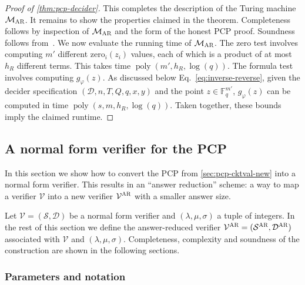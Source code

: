 \documentclass[11pt]{article}
\theoremstyle{definition}
\newcommand{\F}{\ensuremath{\mathbb{F}}}
\DeclareMathOperator{\poly}{poly}
\newcommand{\sampler}{\mathcal{S}}
\newcommand{\decider}{\mathcal{D}}
\newcommand{\verifier}{\mathcal{V}}
\newcommand{\gamestyle}[1]{\ensuremath{\textsc{#1}}\xspace}
\newcommand{\ar}{\gamestyle{AR}}
\newcommand{\pcpverifier}{\mathcal{M}_\ar}
\newcommand{\qlen}{Q}
\begin{document}
\begin{proof}[Proof of \cref{thm:pcp-decider}]
  This completes the description of the Turing machine $\pcpverifier$.
  It remains to show the properties claimed in the theorem.
  Completeness follows by inspection of $\pcpverifier$ and the form of the
  honest PCP proof.
  Soundness follows from~\cite[Proposition~11.8]{NW19}.
  We now evaluate the running time of $\pcpverifier$.
  The zero test involves computing $m'$ different $\mathrm{zero}_i(z_i)$ values,
  each of which is a product of at most $h_R$ different terms.
  This takes time $\poly(m', h_R, \log(q))$.
  The formula test involves computing $g_\varphi(z)$.
  As discussed below Eq.~\eqref{eq:inverse-reverse}, given the decider
  specification $(\decider, n, T, \qlen, q, x, y)$ and the point $z \in
  \F_q^{m'}$, $g_\varphi(z)$ can be computed in time $\poly(s, m, h_R,
  \log(q))$.
  Taken together, these bounds imply the claimed runtime.
\end{proof}

\subsection{A normal form verifier for the PCP}
\label{sec:ld-compiler}

In this section we show how to convert the PCP from \cref{sec:pcp-cktval-new}
into a normal form verifier.
This results in an ``answer reduction'' scheme: a way to map a verifier
$\verifier$ into a new verifier $\verifier^\ar$ with a smaller answer size.
	
Let $\verifier = (\sampler, \decider)$ be a normal form verifier and
$(\lambda,\mu,\sigma)$ a tuple of integers.
In the rest of this section we define the answer-reduced verifier $\verifier^\ar
= (\sampler^\ar, \decider^\ar)$ associated with $\verifier$ and $(\lambda,\mu,\sigma)$.
Completeness, complexity and soundness of the construction are shown in the
following sections.

\subsubsection{Parameters and notation}\label{sec:ar-params}
\end{document}
